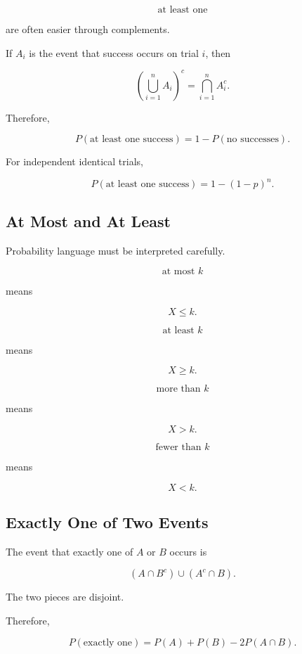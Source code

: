 \[
\text{at least one}
\]

are often easier through complements.

If \(A_i\) is the event that success occurs on trial \(i\), then

\[
\left(
\bigcup_{i=1}^{n}A_i
\right)^c
=
\bigcap_{i=1}^{n}A_i^c.
\]

Therefore,

\[
\boxed{
P(\text{at least one success})
=
1-P(\text{no successes}).
}
\]

For independent identical trials,

\[
\boxed{
P(\text{at least one success})
=
1-(1-p)^n.
}
\]

\subsection{At Most and At Least}
\label{subsec:at-most-at-least}

Probability language must be interpreted carefully.

\[
\text{at most }k
\]

means

\[
\boxed{
X\leq k.
}
\]

\[
\text{at least }k
\]

means

\[
\boxed{
X\geq k.
}
\]

\[
\text{more than }k
\]

means

\[
\boxed{
X>k.
}
\]

\[
\text{fewer than }k
\]

means

\[
\boxed{
X<k.
}
\]

\subsection{Exactly One of Two Events}
\label{subsec:exactly-one-event}

The event that exactly one of \(A\) or \(B\) occurs is

\[
\boxed{
(A\cap B^c)
\cup
(A^c\cap B).
}
\]

The two pieces are disjoint.

Therefore,

\[
\boxed{
P(\text{exactly one})
=
P(A)+P(B)-2P(A\cap B).
}
\]

